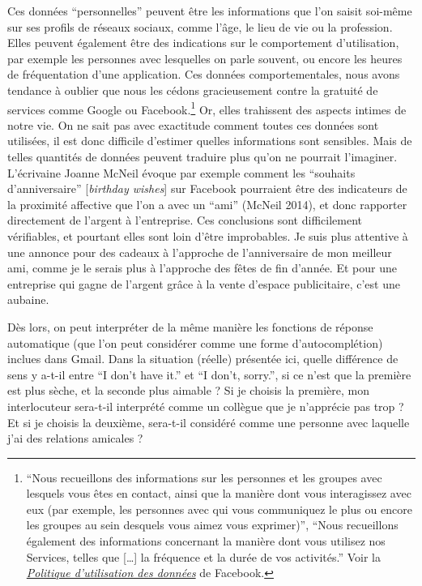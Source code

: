 \documentclass[]{article}
\begin{document}
Ces données ``personnelles'' peuvent être les informations que l'on
saisit soi-même sur ses profils de réseaux sociaux, comme l'âge, le lieu
de vie ou la profession. Elles peuvent également être des indications
sur le comportement d'utilisation, par exemple les personnes avec
lesquelles on parle souvent, ou encore les heures de fréquentation d'une
application. Ces données comportementales, nous avons tendance à oublier
que nous les cédons gracieusement contre la gratuité de services comme
Google ou Facebook.\footnote{``Nous recueillons des informations sur les
  personnes et les groupes avec lesquels vous êtes en contact, ainsi que
  la manière dont vous interagissez avec eux (par exemple, les personnes
  avec qui vous communiquez le plus ou encore les groupes au sein
  desquels vous aimez vous exprimer)'', ``Nous recueillons également des
  informations concernant la manière dont vous utilisez nos Services,
  telles que {[}\ldots{}{]} la fréquence et la durée de vos activités.''
  Voir la
  \href{https://www.facebook.com/privacy/explanations}{\emph{Politique
  d'utilisation des données}} de Facebook.} Or, elles trahissent des
aspects intimes de notre vie. On ne sait pas avec exactitude comment
toutes ces données sont utilisées, il est donc difficile d'estimer
quelles informations sont sensibles. Mais de telles quantités de données
peuvent traduire plus qu'on ne pourrait l'imaginer. L'écrivaine Joanne
McNeil évoque par exemple comment les ``souhaits d'anniversaire''
{[}\emph{birthday wishes}{]} sur Facebook pourraient être des
indicateurs de la proximité affective que l'on a avec un ``ami'' (McNeil
2014), et donc rapporter directement de l'argent à l'entreprise. Ces
conclusions sont difficilement vérifiables, et pourtant elles sont loin
d'être improbables. Je suis plus attentive à une annonce pour des
cadeaux à l'approche de l'anniversaire de mon meilleur ami, comme je le
serais plus à l'approche des fêtes de fin d'année. Et pour une
entreprise qui gagne de l'argent grâce à la vente d'espace publicitaire,
c'est une aubaine.

Dès lors, on peut interpréter de la même manière les fonctions de
réponse automatique (que l'on peut considérer comme une forme
d'autocomplétion) inclues dans Gmail. Dans la situation (réelle)
présentée ici, quelle différence de sens y a-t-il entre ``I don't have
it.'' et ``I don't, sorry.'', si ce n'est que la première est plus
sèche, et la seconde plus aimable ? Si je choisis la première, mon
interlocuteur sera-t-il interprété comme un collègue que je n'apprécie
pas trop ? Et si je choisis la deuxième, sera-t-il considéré comme une
personne avec laquelle j'ai des relations amicales ?
\end{document}
